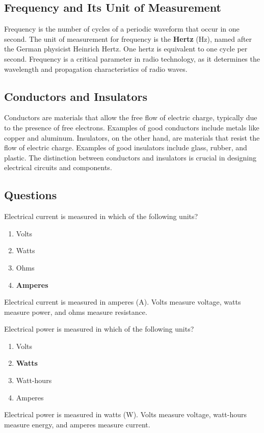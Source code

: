 \subsection*{Frequency and Its Unit of Measurement}
Frequency is the number of cycles of a periodic waveform that occur in one second. The unit of measurement for frequency is the \textbf{Hertz} (Hz), named after the German physicist Heinrich Hertz. One hertz is equivalent to one cycle per second. Frequency is a critical parameter in radio technology, as it determines the wavelength and propagation characteristics of radio waves.

\subsection*{Conductors and Insulators}
Conductors are materials that allow the free flow of electric charge, typically due to the presence of free electrons. Examples of good conductors include metals like copper and aluminum. Insulators, on the other hand, are materials that resist the flow of electric charge. Examples of good insulators include glass, rubber, and plastic. The distinction between conductors and insulators is crucial in designing electrical circuits and components.

\subsection*{Questions}
\begin{tcolorbox}[colback=gray!10!white,colframe=black!75!black,title={T5A01}]
Electrical current is measured in which of the following units?
\begin{enumerate}[label=\Alph*,noitemsep]
    \item Volts
    \item Watts
    \item Ohms
    \item \textbf{Amperes}
\end{enumerate}
\end{tcolorbox}
Electrical current is measured in amperes (A). Volts measure voltage, watts measure power, and ohms measure resistance.


\begin{tcolorbox}[colback=gray!10!white,colframe=black!75!black,title={T5A02}]
Electrical power is measured in which of the following units?
\begin{enumerate}[label=\Alph*,noitemsep]
    \item Volts
    \item \textbf{Watts}
    \item Watt-hours
    \item Amperes
\end{enumerate}
\end{tcolorbox}
Electrical power is measured in watts (W). Volts measure voltage, watt-hours measure energy, and amperes measure current.

